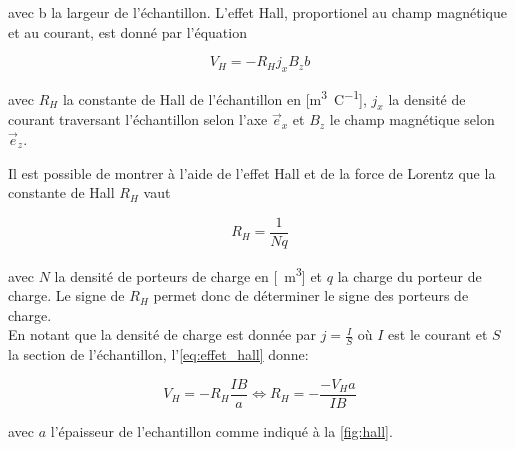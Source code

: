 \begin{minipage}{\textwidth}
    avec b la largeur de l'échantillon. L'effet Hall, proportionel au champ magnétique et au courant, est donné par l'équation

    \begin{equation}
        V_H = -R_H j_x B_z b
        \label{eq:effet_hall}
    \end{equation}

    avec \(R_H\) la constante de Hall de l'échantillon en [\si{\meter\cubed\per\coulomb}], \(j_x\) la densité de courant traversant l'échantillon selon l'axe \(\vec{e}_x\) et \(B_z\) le champ magnétique selon \(\vec{e}_z\). \cite{notice}
\end{minipage}

Il est possible de montrer à l'aide de l'effet Hall et de la force de Lorentz que la constante de Hall \(R_H\) vaut

\begin{equation}
    R_H = \frac{1}{Nq}
    \label{eq:N}
\end{equation}

avec \(N\) la densité de porteurs de charge en [\si{\per\meter\cubed}] et \(q\) la charge du porteur de charge. Le signe de \(R_H\) permet donc de déterminer le signe des porteurs de charge.\\
En notant que la densité de charge est donnée par \(j = \frac{I}{S}\) où \(I\) est le courant et \(S\) la section de l'échantillon, l'\autoref{eq:effet_hall} donne:

\begin{equation}
    V_H = -R_H \frac{IB}{a} \iff R_H = -\frac{-V_H a}{IB}
    \label{eq:R_H}
\end{equation}

avec \(a\) l'épaisseur de l'echantillon comme indiqué à la \autoref{fig:hall}.
